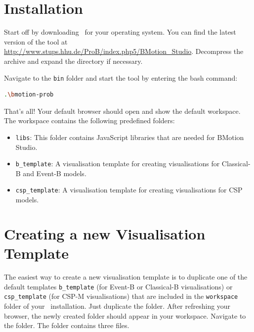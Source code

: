 \section{Installation}
\label{installation}

Start off by downloading \bms~for your operating system. 
You can find the latest version of the tool at \url{http://www.stups.hhu.de/ProB/index.php5/BMotion_Studio}.
Decompress the archive and expand the directory if necessary. 


Navigate to the \texttt{bin} folder and start the tool by entering the bash command:

\begin{lstlisting}[language=bash]
.\bmotion-prob
\end{lstlisting}


That's all! 
Your default browser should open and show the default workspace.
The workspace contains the following predefined folders:

\begin{itemize}
\item \texttt{libs}: This folder contains JavaScript libraries that are needed for BMotion Studio.
\item \texttt{b\_template}: A visualisation template for creating visualisations for Classical-B and Event-B models.
\item \texttt{csp\_template}: A visualisation template for creating visualisations for CSP models.
\end{itemize}

\section{Creating a new Visualisation Template}
\label{vis_template}

The easiest way to create a new visualisation template is to duplicate one of the default templates  \texttt{b\_template} (for Event-B or Classical-B visualisations) or \texttt{csp\_template} (for CSP-M visualisations) that are included in the \texttt{workspace} folder of your \bms~installation.
Just duplicate the folder.
After refreshing your browser, the newly created folder should appear in your workspace.
Navigate to the folder. 
The folder contains three files.

